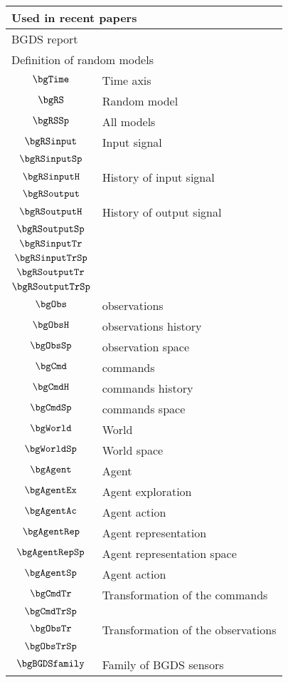 \begin{longtable}{cl}
\multicolumn{2}{l}{Used in recent papers}\\ 
 \hline
\hline
\multicolumn{2}{l}{BGDS report}\\ 
 \hline
\multicolumn{2}{l}{Definition of random models}\\ 
 \hline
$\bgTime$ &  Time axis\\ 
 $\bgRS$ &  Random model\\ 
 $\bgRSSp$ &  All models\\ 
 $\bgRSinput$ &  Input signal\\ 
 $\bgRSinputSp$ &  \\ 
 $\bgRSinputH$ &  History of input signal\\ 
 $\bgRSoutput$ & \\ 
 $\bgRSoutputH$ &  History of output signal\\ 
 $\bgRSoutputSp$ &  \\ 
 $\bgRSinputTr$ &  \\ 
 $\bgRSinputTrSp$ &  \\ 
 $\bgRSoutputTr$ &  \\ 
 $\bgRSoutputTrSp$ & \\ 
 $\bgObs$ &  observations\\ 
 $\bgObsH$ &  observations history\\ 
 $\bgObsSp$ &  observation space\\ 
 $\bgCmd$ &  commands\\ 
 $\bgCmdH$ &  commands history\\ 
 $\bgCmdSp$ &  commands space\\ 
 $\bgWorld$ &  World\\ 
 $\bgWorldSp$ &  World space\\ 
 $\bgAgent$ &  Agent\\ 
 $\bgAgentEx$ &  Agent exploration\\ 
 $\bgAgentAc$ &  Agent action\\ 
 $\bgAgentRep$ &  Agent representation\\ 
 $\bgAgentRepSp$ &  Agent representation space\\ 
 $\bgAgentSp$ &  Agent action\\ 
 $\bgCmdTr$ &  Transformation of the commands\\ 
 $\bgCmdTrSp$ &  \\ 
 $\bgObsTr$ &  Transformation of the observations\\ 
 $\bgObsTrSp$ & \\ 
 $\bgBGDSfamily$ &  Family of BGDS sensors\\ 

\end{longtable}

